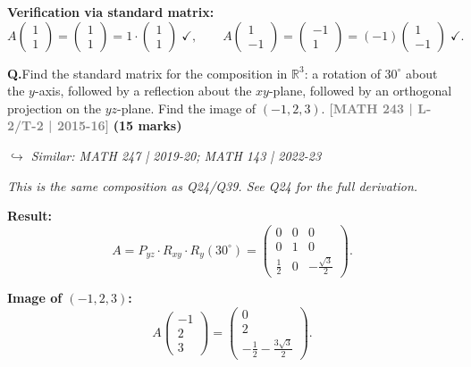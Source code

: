 \documentclass[12pt,a3paper]{article}
\newcommand{\yr}[1]{\hfill\textcolor{gray}{\small\textbf{[#1]}}}
\newcommand{\mk}[1]{\textcolor{orange!70!black}{\small\textbf{(#1 marks)}}}
\newcommand{\variant}[1]{\par\vspace{1pt}\textcolor{blue!50!black}%
  {\footnotesize\textit{$\hookrightarrow$ Similar: #1}}}
\newcounter{qnum}
\newcommand{\Q}[1]{%
  \needspace{4\baselineskip}
  \refstepcounter{qnum}
  \vspace{6pt}
  \noindent\textbf{Q\theqnum.}\enspace #1\par
}
\begin{document}
\begin{tcolorbox}
\textbf{Verification via standard matrix:}
\[
A\begin{pmatrix}1\\1\end{pmatrix}=\begin{pmatrix}1\\1\end{pmatrix}=1\cdot\begin{pmatrix}1\\1\end{pmatrix}\;\checkmark,\qquad
A\begin{pmatrix}1\\-1\end{pmatrix}=\begin{pmatrix}-1\\1\end{pmatrix}=(-1)\begin{pmatrix}1\\-1\end{pmatrix}\;\checkmark.
\]

\end{tcolorbox}

\Q{Find the standard matrix for the composition in $\mathbb{R}^3$: a rotation of $30^\circ$ about the $y$-axis, followed by a reflection about the $xy$-plane, followed by an orthogonal projection on the $yz$-plane. Find the image of $(-1,2,3)$.
\yr{MATH 243 | L-2/T-2 | 2015-16} \mk{15}
\variant{MATH 247 | 2019-20; MATH 143 | 2022-23}}

\begin{tcolorbox}[enhanced,breakable,
  colback=cF!4,colframe=cF,boxrule=0.8pt,arc=5pt,
  title={\textbf{Answer --- Composition: Rot$(30^\circ,y)$ $\to$ Reflect$(xy)$ $\to$ Project$(yz)$; Image of $(-1,2,3)$}},
  fonttitle=\bfseries\color{white},colbacktitle=cF]

\textit{This is the same composition as Q24/Q39. See Q24 for the full derivation.}

\textbf{Result:}
\[
A = P_{yz}\cdot R_{xy}\cdot R_y(30^\circ)=\begin{pmatrix}0&0&0\\0&1&0\\\frac{1}{2}&0&-\frac{\sqrt{3}}{2}\end{pmatrix}.
\]

\textbf{Image of $(-1,2,3)$:}
\[
A\begin{pmatrix}-1\\2\\3\end{pmatrix}=\begin{pmatrix}0\\2\\-\frac{1}{2}-\frac{3\sqrt{3}}{2}\end{pmatrix}.
\]

\end{tcolorbox}
\end{document}

